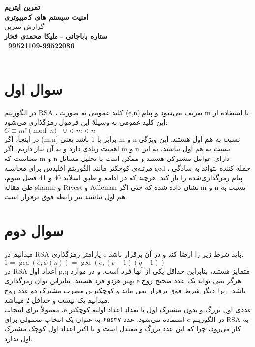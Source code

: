 \def \Subject {تمرین ایتریم}
\def \Course {امنیت سیستم های کامپیوتری}
\def \Author {ستاره باباجانی - ملیکا محمدی فخار}
\def \Report {گزارش تمرین}
\def \StudentNumber {99521109-99522086}

\begin{center}
\vspace{.4cm}
{\bf {\huge \Subject}}\\
\vspace{.6cm}
{\bf \Large \Course}\\
{\Large \Report} \\
\vspace{.3cm}
{\bf \Author }  \\
\vspace{.2cm}
{\bf \ \StudentNumber}\\\

\end{center}

\hspace{\fill} 



\clearpage

\section{سوال اول}
در الگوریتم RSA ، کلید عمومی به صورت (e,n) تعریف می‌شود و پیام m با استفاده از این کلید عمومی به وسیلهٔ این فرمول رمزگذاری می‌شود:\\
$C \equiv m^e \pmod{n} \quad 0 < m < n$ \\
در اینجا، اگر (m,n) برابر با 1 باشد یعنی m و n نسبت به هم اول هستند. این ویژگی اهمیت زیادی دارد و به آن نیاز داریم. اگر m و n  نسبت به هم اول نباشند، به این معناست که m و n دارای عوامل مشترکی هستند و ممکن است با تحلیل مسائل مرتبه‌ی کوچکتر مانند الگوریتم اقلیدس برای محاسبه gcd ، حمله ‌کننده بتواند به سادگی پیام رمزگذاری‌شده را باز کند.
هرچند که در ادامه و طبق اسلاید 40 و 41 فصل سوم، طی مقاله shamir و Rivest و Adleman نشان داده شده که حتی اگر m و n نسبت به هم اول نباشند نیز رابطه فوق برقرار است.

\section{سوال دوم}
میدانیم در RSA پارامتر رمزگذاری e باید شرط زیر را ارضا کند و در آن برقرار باشد.\\
$1 = \gcd(e, \phi(n)) = \gcd(e, (p-1)(q-1))$\\
در RSA اعداد اول p,q متمایز هستند، بنابراین حداقل یکی از آنها فرد است. و در موارد بهتر هردو فرد هستند. بنابراین توان رمزگذاری e هرگز نمی تواند یک عدد صحیح زوج باشد. زیرا دیگر شرط فوق برقرار نمی ماند و کوچکترین مضرب مشترک دو عدد زوج میدانیم یک نیست و حداقل 2 میباشد.\\
معمولاً برای انتخاب ،e عددی اول بزرگ و بدون مشترک اول با تعداد اعداد اولیه کوچکتر استفاده می‌شود. عدد ۶۵۵۳۷ به عنوان یک انتخاب معمولی برای e در الگوریتم RSA به کار می‌رود، چرا که این عدد بزرگ و معتدل است و با اکثر اعداد اول کوچک مشترک اول ندارد.

